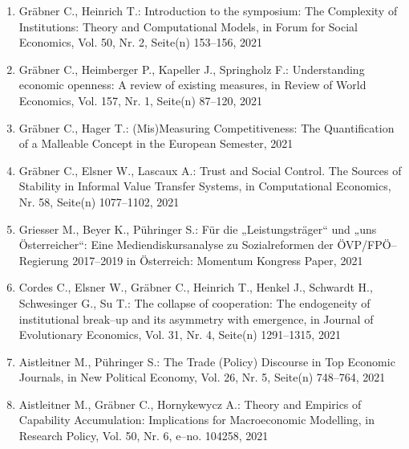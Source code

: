 \begin{enumerate}
	 \item Gräbner C., Heinrich T.: Introduction to the symposium: The Complexity of Institutions: Theory and Computational Models, in Forum for Social Economics, Vol. 50, Nr. 2, Seite(n) 153--156, 2021
	 \item Gräbner C., Heimberger P., Kapeller J., Springholz F.: Understanding economic openness: A review of existing measures, in Review of World Economics, Vol. 157, Nr. 1, Seite(n) 87--120, 2021
	 \item Gräbner C., Hager T.: (Mis)Measuring Competitiveness:  The Quantification of a Malleable Concept in the European Semester, 2021
	 \item Gräbner C., Elsner W., Lascaux A.: Trust and Social Control. The Sources of Stability in Informal Value Transfer Systems, in Computational Economics, Nr. 58, Seite(n) 1077--1102, 2021
	 \item Griesser M., Beyer K., Pühringer S.: Für die „Leistungsträger“ und „uns Österreicher“: Eine Mediendiskursanalyse zu Sozialreformen der ÖVP/FPÖ--Regierung 2017--2019 in Österreich: Momentum Kongress Paper, 2021
	 \item Cordes C., Elsner W., Gräbner C., Heinrich T., Henkel J., Schwardt H., Schwesinger G., Su T.: The collapse of cooperation: The endogeneity of institutional break--up and its asymmetry with emergence, in Journal of Evolutionary Economics, Vol. 31, Nr. 4, Seite(n) 1291--1315, 2021
	 \item Aistleitner M., Pühringer S.: The Trade (Policy) Discourse in Top Economic Journals, in New Political Economy, Vol. 26, Nr. 5, Seite(n) 748--764, 2021
	 \item Aistleitner M., Gräbner C., Hornykewycz A.: Theory and Empirics of Capability Accumulation: Implications for Macroeconomic Modelling, in Research Policy, Vol. 50, Nr. 6, e--no. 104258, 2021
\end{enumerate}
